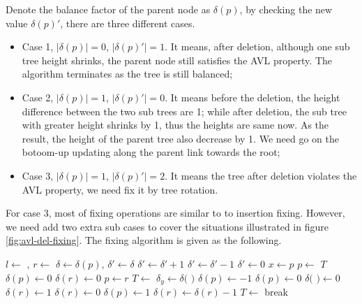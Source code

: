 \documentclass[UTF8]{article}
\begin{document}
Denote the balance factor of the parent node as $\delta(p)$, by checking the new value
$\delta(p)'$, there are three different cases.

\begin{itemize}
\item Case 1, $|\delta(p)| = 0$, $|\delta(p)'| = 1$. It means, after deletion,
although one sub tree height shrinks, the parent node still satisfies the AVL
property. The algorithm terminates as the tree is still balanced;
\item Case 2, $|\delta(p)| = 1$, $|\delta(p)'| = 0$. It means before the deletion,
the height difference between the two sub trees are 1; while after deletion, the
sub tree with greater height shrinks by 1, thus the heights are same now. As the
result, the height of the parent tree also decrease by 1. We need go on the
botoom-up updating along the parent link towards the root;
\item Case 3, $|\delta(p)| = 1$, $|\delta(p)'| = 2$. It means the tree after deletion
violates the AVL property, we need fix it by tree rotation.
\end{itemize}

For case 3, most of fixing operations are similar to to insertion fixing. However,
we need add two extra sub cases to cover the situations illustrated in figure
\ref{fig:avl-del-fixing}. The fixing algorithm is given as the following.

\begin{algorithmic}[1]
    \State $l \gets$ , $r \gets$ 
    \State $\delta \gets \delta(p)$, $\delta' \gets \delta$
      \State $\delta' \gets \delta' + 1$
    \Else
      \State $\delta' \gets \delta' - 1$
    \EndIf
     
      \State $\delta' \gets 0$
    \EndIf
      \State $x \gets p$
      \State $p \gets$ 
      \State \Return $T$
         
          \State $\delta(p) \gets 0$
          \State $\delta(r) \gets 0$
          \State $p \gets r$
          \State $T \gets $ 
         
          \State $\delta_y \gets \delta($  $)$
            \State $\delta(p) \gets -1$
          \Else
            \State $\delta(p) \gets 0$
          \EndIf
          \State $\delta($  $) \gets 0$
            \State $\delta(r) \gets 1$
          \Else
            \State $\delta(r) \gets 0$
          \EndIf
        \Else {}
          \State $\delta(p) \gets 1$
          \State $\delta(r) \gets \delta(r) - 1$
          \State $T \gets$ 
          \State break 
        \EndIf
      \EndIf
    \EndIf
  \EndWhile
\EndFunction
\end{algorithmic}
\end{document}
